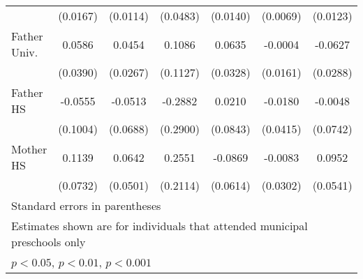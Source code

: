 \begin{table}[htbp]
\begin{tabular}{l*{6}{c}}
            &    (0.0167)         &    (0.0114)         &    (0.0483)         &    (0.0140)         &    (0.0069)         &    (0.0123)         \\
\addlinespace
Father Univ.&      0.0586         &      0.0454         &      0.1086         &      0.0635         &     -0.0004         &     -0.0627\sym{*}  \\
            &    (0.0390)         &    (0.0267)         &    (0.1127)         &    (0.0328)         &    (0.0161)         &    (0.0288)         \\
\addlinespace
Father HS   &     -0.0555         &     -0.0513         &     -0.2882         &      0.0210         &     -0.0180         &     -0.0048         \\
            &    (0.1004)         &    (0.0688)         &    (0.2900)         &    (0.0843)         &    (0.0415)         &    (0.0742)         \\
\addlinespace
Mother HS   &      0.1139         &      0.0642         &      0.2551         &     -0.0869         &     -0.0083         &      0.0952         \\
            &    (0.0732)         &    (0.0501)         &    (0.2114)         &    (0.0614)         &    (0.0302)         &    (0.0541)         \\
\bottomrule
\multicolumn{7}{l}{\footnotesize Standard errors in parentheses}\\
\multicolumn{7}{l}{\footnotesize Estimates shown are for individuals that attended municipal preschools only}\\
\multicolumn{7}{l}{\footnotesize \sym{*} \(p<0.05\), \sym{**} \(p<0.01\), \sym{***} \(p<0.001\)}\\
\end{tabular}
\end{table}
